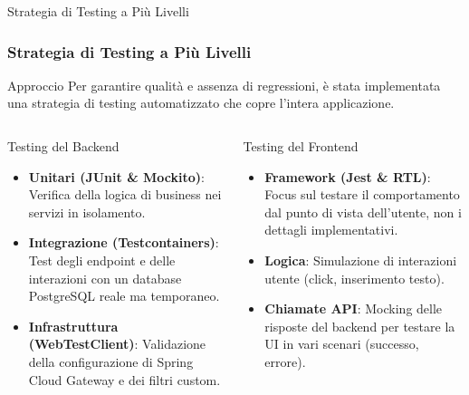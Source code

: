 \documentclass[8pt]{beamer}
\begin{document}

\begin{frame}{Strategia di Testing a Più Livelli}
    \frametitle{Strategia di Testing a Più Livelli}
    
    \begin{block}{Approccio}
        Per garantire qualità e assenza di regressioni, è stata implementata una strategia di testing automatizzato che copre l'intera applicazione.
    \end{block}

    \begin{columns}[T]
            \begin{exampleblock}{Testing del Backend}
                \begin{itemize}
                    \item \textbf{Unitari (JUnit \& Mockito)}: Verifica della logica di business nei servizi in isolamento.
                    \item \textbf{Integrazione (Testcontainers)}: Test degli endpoint e delle interazioni con un database PostgreSQL reale ma temporaneo.
                    \item \textbf{Infrastruttura (WebTestClient)}: Validazione della configurazione di Spring Cloud Gateway e dei filtri custom.
                \end{itemize}
            \end{exampleblock}

            \begin{exampleblock}{Testing del Frontend}
                \begin{itemize}
                    \item \textbf{Framework (Jest \& RTL)}: Focus sul testare il comportamento dal punto di vista dell'utente, non i dettagli implementativi.
                    \item \textbf{Logica}: Simulazione di interazioni utente (click, inserimento testo).
                    \item \textbf{Chiamate API}: Mocking delle risposte del backend per testare la UI in vari scenari (successo, errore).
                \end{itemize}
            \end{exampleblock}
    \end{columns}
\end{frame}
\end{document}
